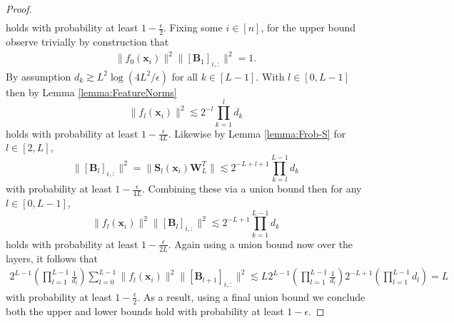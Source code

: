 \documentclass{article}
\theoremstyle{definition}
\def\vx{{\bm{x}}}
\def\mB{{\bm{B}}}
\def\mS{{\bm{S}}}
\def\mW{{\bm{W}}}
\begin{document}
\begin{proof}
\begin{align*}
    \end{align*}
    holds with probability at least $1 - \tfrac{\epsilon}{2}$. Fixing some $i\in [n]$, for the upper bound observe trivially by construction that
    \begin{align*}
        \| f_0(\vx_i) \|^2 \| [\mB_1]_{i,:} \|^2 = 1.
    \end{align*}
    By assumption $d_k \gtrsim L^2 \log(4L^2/\epsilon)$ for all $k \in [L-1]$. With $l \in [0, L-1]$ then by Lemma \ref{lemma:FeatureNorms}
    \[
    \| f_l(\vx_i) \|^2 \lesssim 2^{-l}\prod_{k=1}^{l} d_k
    \]
    holds with probability at least $1- \tfrac{\epsilon}{4L}$. Likewise by Lemma \ref{lemma:Frob-S} for $l \in [2, L]$,
    \[
    \| [\mB_{l}]_{i,:} \|^2 = \| \mS_l(\vx_i)\mW_L^T \| \lesssim 2^{-L+l+1} \prod_{k=l}^{L-1} d_k
    \]
    with probability at least $1- \tfrac{\epsilon}{4L}$. Combining these via a union bound then for any $l \in [0, L-1]$,
    \[
     \| f_l(\vx_i) \|^2 \| [\mB_{l}]_{i,:} \|^2 \lesssim 2^{-L+1} \prod_{k=1}^{L-1} d_k
    \]
    holds with probability at least $1- \tfrac{\epsilon}{2L}$. Again using a union bound now over the layers, it follows that
    \begin{align}
        2^{L-1}\left( \prod_{l = 1}^{L - 1}\frac{1}{d_l}\right) \sum_{l=0}^{L-1} \| f_l(\vx_i) \|^2 \| [\mB_{l+1}]_{i,:} \|^2 \lesssim L 2^{L-1}\left( \prod_{l = 1}^{L - 1}\frac{1}{d_l}\right)  2^{-L+1} \left( \prod_{l=1}^{L-1} d_l \right) = L
    \end{align}
    with probability at least $1 - \tfrac{\epsilon}{2}$. As a result, using a final union bound we conclude both the upper and lower bounds hold with probability at least $1-\epsilon$.
\end{proof}
\end{document}
